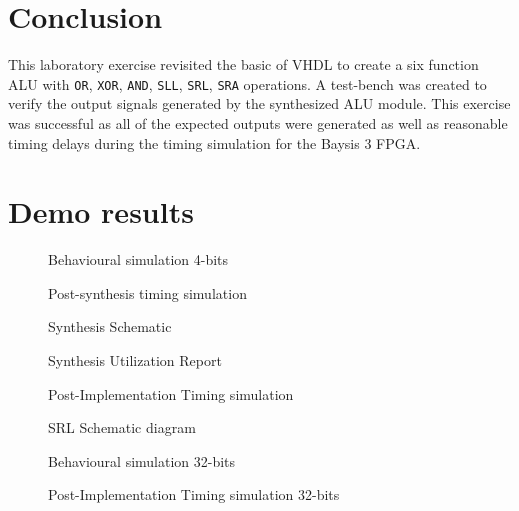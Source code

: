 \documentclass[CMPE]{../KGCOEReport}
\def\code#1{\texttt{#1}}
\begin{document}
    \section*{Conclusion}
    This laboratory exercise revisited the basic of VHDL to create a six function ALU with \code{OR}, \code{XOR},
    \code{AND}, \code{SLL}, \code{SRL}, \code{SRA} operations.
    A test-bench was created to verify the output signals generated by the synthesized ALU module.
    This exercise was successful as all of the expected outputs were generated as well as reasonable timing delays
    during the timing simulation for the Baysis 3 FPGA.

    \pagebreak
    \section*{Demo results}
    \begin{figure}[h!]
        \centering
        \caption{Behavioural simulation 4-bits}
        \label{fig:demo1}
    \end{figure}

    \begin{figure}[h!]
        \centering
        \caption{Post-synthesis timing simulation}
        \label{fig:demo2}
    \end{figure}
    \begin{figure}[h!]
        \centering
        \caption{Synthesis Schematic}
        \label{fig:demo3}
    \end{figure}
    \begin{figure}[h!]
        \centering
        \caption{Synthesis Utilization Report}
        \label{fig:demo4}
    \end{figure}
    \begin{figure}[h!]
        \centering
        \caption{Post-Implementation Timing simulation}
        \label{fig:demo5}
    \end{figure}
    \begin{figure}[h!]
        \centering
        \caption{SRL Schematic diagram}
        \label{fig:demo6}
    \end{figure}
    \begin{figure}[h!]
        \centering
        \caption{Behavioural simulation 32-bits}
        \label{fig:demo7}
    \end{figure}
    \begin{figure}[h!]
        \centering
        \caption{Post-Implementation Timing simulation 32-bits}
        \label{fig:demo8}
    \end{figure}
\end{document}
